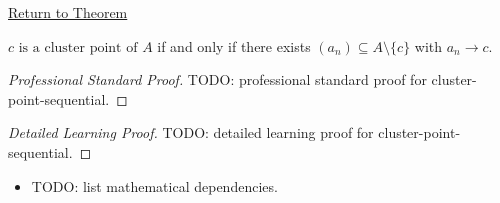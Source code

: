 \newpage
{}
\label{prf:cluster-point-sequential}

\begin{remark*}[Return]
\hyperref[thm:cluster-point-sequential]{Return to Theorem}
\end{remark*}

\begin{theorem*}
$c\text{ is a cluster point of }A$ if and only if there exists
$(a_n) \subseteq A \setminus \{c\}$ with $a_n \to c$.

\smallskip\noindent
\end{theorem*}

\begin{proof}[Professional Standard Proof]
\LRAProofBodyStart
TODO: professional standard proof for cluster-point-sequential.
\end{proof}

\begin{proof}[Detailed Learning Proof]
\LRAProofBodyStart
TODO: detailed learning proof for cluster-point-sequential.
\end{proof}

\begin{remark*}
\end{remark*}

\begin{dependencies}
\begin{itemize}
  \item TODO: list mathematical dependencies.
\end{itemize}
\end{dependencies}

\clearpage
